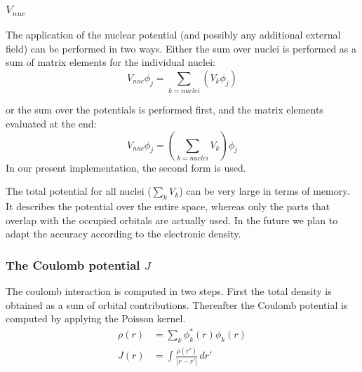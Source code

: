 \documentclass[%
 aip,
 amsmath,amssymb,
 reprint,%
]{revtex4-1}
\begin{document}
\subsubsection{$V_{nuc}$}


The application of the nuclear potential (and possibly any additional external field) can be performed in two ways. Either the sum over nuclei is performed as a sum of matrix elements for the individual nuclei:
\begin{equation}
  V_{nuc} \phi_j = \sum_{k = nuclei} (V_k \phi_j)
\end{equation}

or the sum over the potentials is performed first, and the matrix elements evaluated at the end:
\begin{equation}
  V_{nuc} \phi_j = (\sum_{k = nuclei} V_k) \phi_j
\end{equation}
In our present implementation, the second form is used.

The total potential for all nuclei ($\sum_{k} V_k$) can be very large in terms of memory. It describes the potential over the entire space, whereas only the parts that overlap with the occupied orbitals are actually used. In the future we plan to adapt the accuracy according to the electronic density.




\subsubsection{The Coulomb potential $J$}

The coulomb interaction is computed in two steps. First the total density is obtained as a sum of orbital contributions. Thereafter the Coulomb potential is computed by applying the Poisson kernel.
\begin{eqnarray}
  \rho(r) &= \sum_k \phi^*_k(r)\phi_k(r)\\
  J(r) &= \int \frac{\rho(r')}{|r-r'|} \, dr'
\end{eqnarray}
\end{document}
